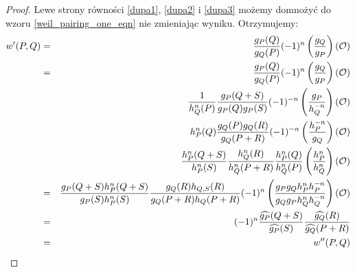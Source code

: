 \begin{proof}
Lewe strony równości \ref{dupa1}, \ref{dupa2} i \ref{dupa3}
możemy domnożyć do wzoru \ref{weil_pairing_one_eqn}
nie zmieniając wyniku.
Otrzymujemy:
\begin{eqnarray*}
w'(P,Q)
& = & \frac{g_P(Q)}{g_Q(P)}(-1)^n\left(\frac{g_Q}{g_P}\right)(\mathcal{O}) \\
& = & \frac{g_P(Q)}{g_Q(P)}(-1)^n\left(\frac{g_Q}{g_P}\right)(\mathcal{O}) \\
&   & \frac{1}{h_Q^n(P)}\frac{g_P(Q+S)}{g_P(Q)g_P(S)}
      (-1)^{-n}\left(\frac{g_P}{h_Q^{-n}}\right)(\mathcal{O}) \\
&   & h_P^n(Q)\frac{g_Q(P)g_Q(R)}{g_Q(P+R)}
      (-1)^{-n}\left(\frac{h_P^{-n}}{g_Q}\right)(\mathcal{O}) \\
&   & \frac{h_P^n(Q+S)}{h_P^n(S)}
      \frac{h_Q^n(R)}{h_Q^n(P+R)}
      \frac{h_P^n(Q)}{h_Q^n(P)}
      \left(\frac{h_P^n}{h_Q^n}\right)(\mathcal{O}) \\
& = & \frac{g_P(Q+S)h_P^n(Q+S)}{g_P(S)h_P^n(S)}
      \frac{g_Q(R)h_{Q,S}(R)}{g_Q(P+R)h_Q(P+R)}
      (-1)^n\left(
      \frac{g_Pg_Qh_P^nh_P^{-n}}{g_Qg_Ph_Q^nh_Q^{-n}}
      \right)(\mathcal{O}) \\
& = & (-1)^n\frac{\widehat{g_P}(Q+S)}{\widehat{g_P}(S)}
      \frac{\widehat{g_Q}(R)}{\widehat{g_Q}(P+R)} \\
& = & w''(P,Q)
\end{eqnarray*}
\end{proof}
